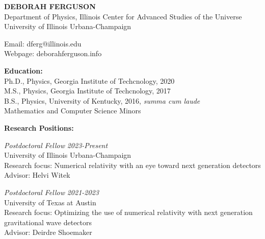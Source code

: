 \documentclass[11pt]{article}
\begin{document}
%	
\begin{center}
  \textbf{DEBORAH FERGUSON}\\
  Department of Physics, Illinois Center for Advanced Studies of the Universe\\
  University of Illinois Urbana-Champaign\\
\end{center}  

\begin{flushleft}

  Email: dferg@illinois.edu\\
  Webpage: deborahferguson.info\\
  \vspace{8px}
  
  \textbf{Education:}\\
  Ph.D., Physics, Georgia Institute of Techcnology, 2020\\
  M.S., Physics, Georgia Institute of Techcnology, 2017\\
  B.S., Physics, University of Kentucky, 2016, \textit{summa cum laude} \\ Mathematics and Computer Science Minors\\

\vspace{8px}

  \textbf{Research Positions:}\\
  \vspace{4px}
  
  \textit{Postdoctoral Fellow} \hfill \textit{2023-Present} \\
  University of Illinois Urbana-Champaign\\
  Research focus: Numerical relativity with an eye toward next generation detectors\\
  Advisor: Helvi Witek\\
  
 \vspace{8px}  
 
  \textit{Postdoctoral Fellow} \hfill \textit{2021-2023} \\
  University of Texas at Austin\\
  Research focus: Optimizing the use of numerical relativity with next generation\\ gravitational wave detectors\\
  Advisor: Deirdre Shoemaker\\
  
 \vspace{8px}  
  

\end{flushleft}
\end{document}

